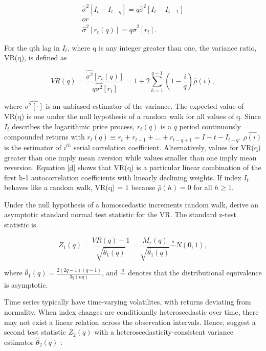 \documentclass[AEJ,reqno, draftmode]{AEA}
\begin{document}
\begin{equation}
\label{eq: c}
    \begin{gathered}
        \hat{\sigma}^2[I_t - I_{t-q}] = q\hat{\sigma}^2[I_t - I_{t-1}]   \\ 
            or \\
          \hat{\sigma}^2[r_t(q)] = q\hat{\sigma}^2[r_t].
      \end{gathered}
\end{equation}

For the qth lag in $I_t$, where q is any integer greater than one, the variance ratio, VR(q), is defined as

\begin{equation} \label{d}
    VR(q) = \frac{\hat{\sigma^2}[r_t(q)]}{q\hat{\sigma^2}[r_t]} = 1 + 2\sum_{h=1}^{q-1}(1-\frac{i}{q})\hat{\rho}(i),
\end{equation}

where $\hat{\sigma^2[\cdot]}$ is an unbiased estimator of the variance. The expected value of VR(q) is one under the null hypothesis of a random walk for all values of q. Since $I_t$ describes the logarithmic price process, $r_t(q)$ is a $q$ period continuously compounded returns with $r_t(q) \equiv r_t + r_{t-1} + ... + r_{t-q+1} = I-t - I_{t-q}$. $\hat{\rho(i)}$ is the estimator of $i^{th}$ serial correlation coefficient. Alternatively, values for VR(q) greater than one imply mean aversion while values smaller than one imply mean reversion. Equation \eqref{d} shows that VR(q) is a particular linear combination of the first h-1 autocorrelation coefficients with linearly declining weights. If index $I_t$ behaves like a random walk, VR(q) = 1 because $\hat{\rho}(h) = 0$ for all $h\geq 1$.

Under the null hypothesis of a homoscedastic increments random walk, \citet{lo1988stock} derive an asymptotic standard normal test statistic for the VR. The standard z-test statistic is 


\begin{equation} \label{e}
    Z_1(q) = \frac{VR(q)-1}{\sqrt{\hat{\theta}_1(q)}} =  \frac{M_r(q)}{\sqrt{\hat{\theta}_1(q)}} \stackrel{a}{\sim} N(0,1) ,
\end{equation}


where $\hat{\theta}_1(q) = \frac{2(2q-1)(q-1)}{3q(nq)}$, and $\stackrel{a}{\sim}$ denotes that the distributional equivalence is asymptotic.

Time series typically have time-varying volatilites, with returns deviating from normality. When index changes are conditionally heteroscedastic over time, there may not exist a linear relation across the observation intervals. Hence, \citet{lo1988stock} suggest a second test statistic $Z_2(q)$ with a heteroscedasticity-consistent variance estimator $\hat{\theta}_2(q)$ :
\end{document}
